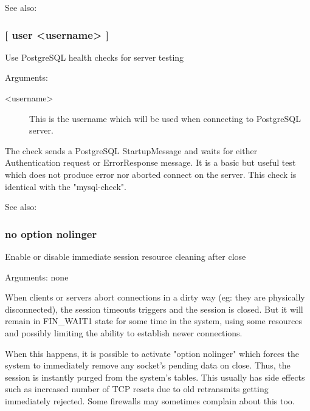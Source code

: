See also: 

\subsubsection[pgsql-check]{ [ user <username> ]}


  Use PostgreSQL health checks for server testing


  Arguments:
\begin{description}
\item[<username>] This is the username which will be used when connecting to
               PostgreSQL server.
\end{description}

  The check sends a PostgreSQL StartupMessage and waits for either
  Authentication request or ErrorResponse message. It is a basic but useful
  test which does not produce error nor aborted connect on the server.
  This check is identical with the "mysql-check".


See also: 

\subsubsection[nolinger]{}
\subsubsection*{no option nolinger}


  Enable or disable immediate session resource cleaning after close


  Arguments: none

  When clients or servers abort connections in a dirty way (eg: they are
  physically disconnected), the session timeouts triggers and the session is
  closed. But it will remain in FIN\_WAIT1 state for some time in the system,
  using some resources and possibly limiting the ability to establish newer
  connections.

  When this happens, it is possible to activate "option nolinger" which forces
  the system to immediately remove any socket's pending data on close. Thus,
  the session is instantly purged from the system's tables. This usually has
  side effects such as increased number of TCP resets due to old retransmits
  getting immediately rejected. Some firewalls may sometimes complain about
  this too.


